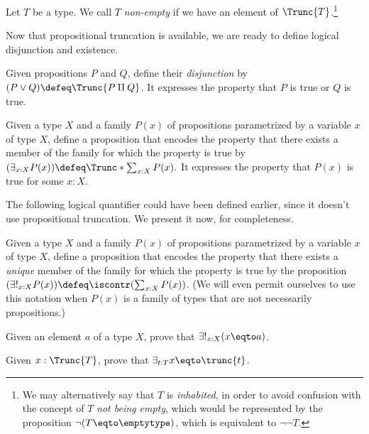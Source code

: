 \begin{definition}\label{def:non-empty}
  Let $T$ be a type.
  We call $T$ \emph{non-empty}
  if we have an element of $\Trunc{T}$.\footnote{%
    We may alternatively say that $T$ is \emph{inhabited},
    in order to avoid confusion with the
    concept of $T$ \emph{not being empty},
    which would be represented by the proposition
    $\neg(T \eqto \emptytype)$, which is equivalent to
    $\neg\neg T$.}
\end{definition}

Now that propositional truncation is available, we are ready to define logical disjunction and existence.

\begin{definition}
  Given propositions $P$ and $Q$, define their \emph{disjunction} by  $(P \vee Q) \defeq \Trunc{P \amalg Q}$.
  It expresses the property that $P$ is true or $Q$ is true.
\end{definition}

\begin{definition}
  Given a type $X$ and a family $P(x)$ of propositions parametrized by a variable $x$ of type $X$,
  define a proposition that encodes the property that there exists a member of the family for which
  the property is true by $(\exists_{x:X} P(x)) \defeq \Trunc*{\sum_{x:X} P(x)}.$
  It expresses the property that $P(x)$ is true for some $x:X$.
\end{definition}

The following logical quantifier could have been defined earlier, since it doesn't use propositional truncation.  We present
it now, for completeness.

\begin{definition}
  Given a type $X$ and a family $P(x)$ of propositions parametrized by a variable $x$ of type $X$,
  define a proposition that encodes the property that there exists a \emph{unique} member of the family for which
  the property is true by the proposition $(\exists!_{x:X} P(x)) \defeq \iscontr({\sum_{x:X} P(x)})$.
  (We will even permit ourselves to use this notation when $P(x)$ is a family of types that are not necessarily propositions.)
\end{definition}

\begin{xca}
  Given an element $a$ of a type $X$, prove that $\exists!_{x:X} ( x \eqto a )$.
\end{xca}

\begin{xca}
  Given $x:\Trunc{T}$, prove that $\exists_{t:T} x \eqto \trunc{t}$.
\end{xca}

